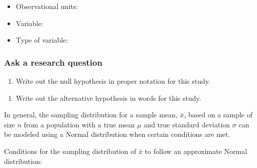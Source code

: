 \documentclass[
]{report}
\providecommand{\tightlist}{%
  \setlength{\itemsep}{0pt}\setlength{\parskip}{0pt}}
\begin{document}
\begin{itemize}
\item
  Observational units:
\item
  Variable:
\item
  Type of variable:
\end{itemize}

\subsubsection*{Ask a research question}\label{ask-a-research-question-2}

\begin{enumerate}
\def\labelenumi{\arabic{enumi}.}
\tightlist
\item
  Write out the null hypothesis in proper notation for this study.
\end{enumerate}

\vspace{0.5in}

\begin{enumerate}
\def\labelenumi{\arabic{enumi}.}
\setcounter{enumi}{1}
\tightlist
\item
  Write out the alternative hypothesis in words for this study.
\end{enumerate}

\vspace{0.8in}

In general, the sampling distribution for a sample mean, \(\bar{x}\), based on a sample of size \(n\) from a population with a true mean \(\mu\) and true standard deviation \(\sigma\) can be modeled using a Normal distribution when certain conditions are met.

\newpage

Conditions for the sampling distribution of \(\bar{x}\) to follow an approximate Normal distribution:
\end{document}
